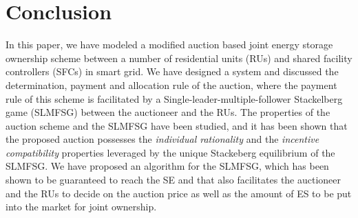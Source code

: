 \documentclass[journal,10pt]{IEEEtran}
\begin{document}
\section{Conclusion}\label{sec:conclusion}
In this paper, we have modeled a modified auction based joint energy storage ownership scheme between a number of residential units (RUs) and shared facility controllers (SFCs) in smart grid. We have designed a system and discussed the determination, payment and allocation rule of the auction, where the payment rule of this scheme is facilitated by a Single-leader-multiple-follower Stackelberg game (SLMFSG) between the auctioneer and the RUs. The properties of the auction scheme and the SLMFSG have been studied, and it has been shown that the proposed auction possesses the \emph{individual rationality} and the \emph{incentive compatibility} properties leveraged by the unique Stackeberg equilibrium of the SLMFSG. We have proposed an algorithm for the SLMFSG, which has been shown to be guaranteed to reach the SE and that also facilitates the auctioneer and the RUs to decide on the auction price as well as the amount of ES to be put into the market for joint ownership. 
\end{document}
